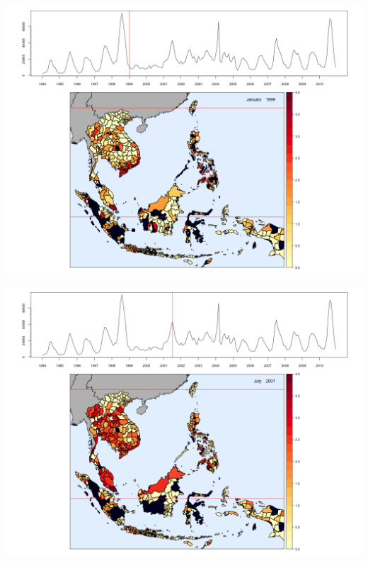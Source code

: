 \begin{center}
\begin{minipage}{0.5\textwidth}
\includegraphics[width=\linewidth]{../figures/chap2/Test61.png}
\label{fig2c}
\end{minipage}\hfill
\begin{minipage}{0.5\textwidth}
\includegraphics[width=\linewidth]{../figures/chap2/Test91.png} 
\label{fig2d}
\end{minipage}
\begin{minipage}{0.5\textwidth}

\end{minipage}
\end{center}
